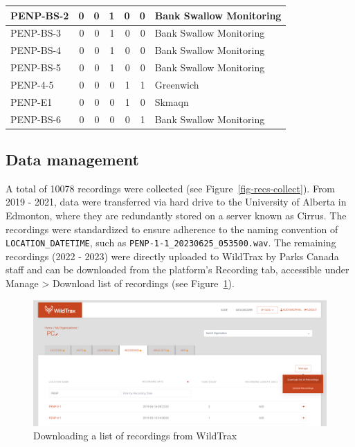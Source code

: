 \documentclass[
  letterpaper,
  DIV=11,
  numbers=noendperiod,
  oneside]{scrartcl}
\begin{document}
\begin{margintable}
\begin{table}
\begin{tabular}[t]{l|r|r|r|r|r|l}
\hline
PENP-BS-2 & 0 & 0 & 1 & 0 & 0 & Bank Swallow Monitoring\\
\hline
PENP-BS-3 & 0 & 0 & 1 & 0 & 0 & Bank Swallow Monitoring\\
\hline
PENP-BS-4 & 0 & 0 & 1 & 0 & 0 & Bank Swallow Monitoring\\
\hline
PENP-BS-5 & 0 & 0 & 1 & 0 & 0 & Bank Swallow Monitoring\\
\hline
PENP-4-5 & 0 & 0 & 0 & 1 & 1 & Greenwich\\
\hline
PENP-E1 & 0 & 0 & 0 & 1 & 0 & Skmaqn\\
\hline
PENP-BS-6 & 0 & 0 & 0 & 0 & 1 & Bank Swallow Monitoring\\
\hline
\end{tabular}
\end{table}

\end{margintable}

\hypertarget{data-management}{%
\subsection{Data management}\label{data-management}}

A total of 10078 recordings were collected (see
Figure~\ref{fig-recs-collect}). From 2019 - 2021, data were transferred
via hard drive to the University of Alberta in Edmonton, where they are
redundantly stored on a server known as Cirrus. The recordings were
standardized to ensure adherence to the naming convention of
\texttt{LOCATION\_DATETIME}, such as
\texttt{PENP-1-1\_20230625\_053500.wav}. The remaining recordings (2022
- 2023) were directly uploaded to WildTrax by Parks Canada staff and can
be downloaded from the platform's Recording tab, accessible under Manage
\textgreater{} Download list of recordings (see
Figure~\ref{fig-download-recs}).

\begin{figure}

{\centering \includegraphics{download-recs.png}

}

\caption{\label{fig-download-recs}Downloading a list of recordings from
WildTrax}

\end{figure}
\end{document}
